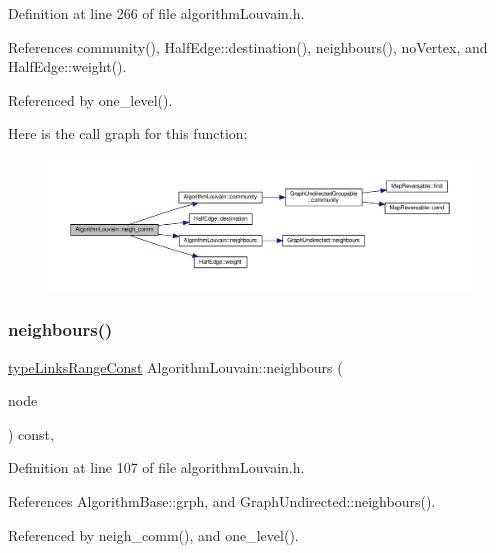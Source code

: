 Definition at line 266 of file algorithm\+Louvain.\+h.



References community(), Half\+Edge\+::destination(), neighbours(), no\+Vertex, and Half\+Edge\+::weight().



Referenced by one\+\_\+level().

Here is the call graph for this function\+:
\nopagebreak
\begin{figure}[H]
\begin{center}
\leavevmode
\includegraphics[width=350pt]{classAlgorithmLouvain_a78dfa81bd96f4036e44c17318501b6b7_cgraph}
\end{center}
\end{figure}
\mbox{\label{classAlgorithmLouvain_ab6206bfc3cf537277c6965bc0da6d695}} 
\subsubsection{\texorpdfstring{neighbours()}{neighbours()}}
{\footnotesize\ttfamily \hyperlink{graphInterface_8h_ae8d27008f15586bbf419af7ad2e0a48a}{type\+Links\+Range\+Const} Algorithm\+Louvain\+::neighbours (\begin{DoxyParamCaption}\item[{const \hyperlink{edge_8h_a5fbd20c46956d479cb10afc9855223f6}{type\+Vertex} \&}]{node }\end{DoxyParamCaption}) const\hspace{0.3cm}{\ttfamily [inline]}, {\ttfamily [private]}}



Definition at line 107 of file algorithm\+Louvain.\+h.



References Algorithm\+Base\+::grph, and Graph\+Undirected\+::neighbours().



Referenced by neigh\+\_\+comm(), and one\+\_\+level().

